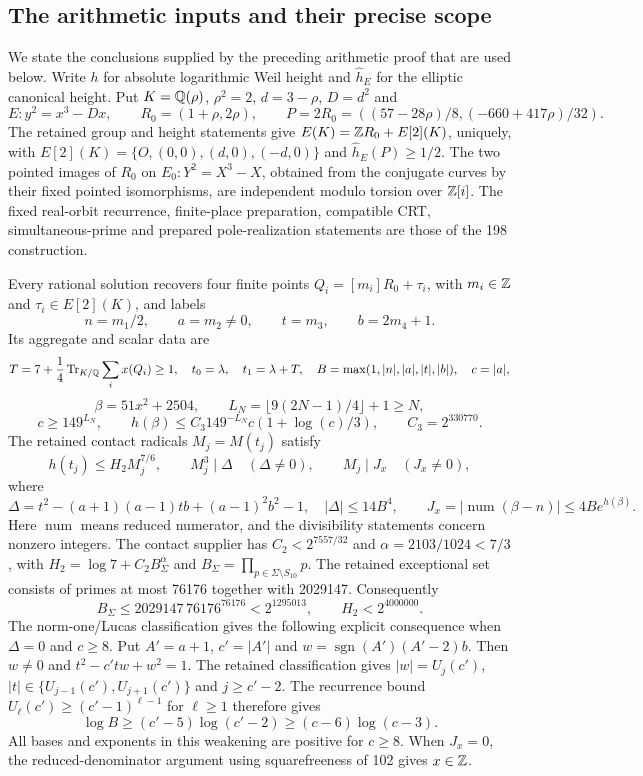 \subsection{The arithmetic inputs and their precise scope}
\label{q198bb:inputs}
We state the conclusions supplied by the preceding arithmetic proof
that are used below. Write $h$ for absolute logarithmic Weil height and
$\widehat h_E$ for the elliptic canonical height.
Put $K=\mathbb Q(\rho)$, $\rho^2=2$, $d=3-\rho$, $D=d^2$ and
\[
 E:y^2=x^3-Dx,\qquad R_0=(1+\rho,2\rho),\qquad
 P=2R_0=\left((57-28\rho)/8,(-660+417\rho)/32\right).
\]
The retained group and height statements give
$E(K)=\mathbb Z R_0+E[2](K)$, uniquely, with
$E[2](K)=\{O,(0,0),(d,0),(-d,0)\}$ and
$\widehat h_E(P)\ge1/2$. The two pointed images of $R_0$ on
$E_0:Y^2=X^3-X$, obtained from the conjugate curves by their fixed
pointed isomorphisms, are independent modulo torsion over $\mathbb Z[i]$.
The fixed real-orbit recurrence, finite-place preparation, compatible
CRT, simultaneous-prime and prepared pole-realization statements are
those of the 198 construction.

Every rational solution recovers four finite points
$Q_i=[m_i]R_0+\tau_i$, with $m_i\in\mathbb Z$ and $\tau_i\in E[2](K)$,
and labels
\[
 n=m_1/2,\qquad a=m_2\ne0,\qquad t=m_3,\qquad b=2m_4+1.
\]
Its aggregate and scalar data are
\[
 T=7+\frac14\operatorname{Tr}_{K/\mathbb Q}\sum_i x(Q_i)\ge1,
 \quad t_0=\lambda,\quad t_1=\lambda+T,
 \quad B=\max(1,|n|,|a|,|t|,|b|),\quad c=|a|,
\]
\[
 \beta=51x^2+2504,\qquad
 L_N=\lfloor9(2N-1)/4\rfloor+1\ge N,
\]
\[
 c\ge149^{L_N},\qquad
 h(\beta)\le C_3 149^{-L_N}c(1+\log(c)/3),\qquad C_3=2^{330770}.
\]
The retained contact radicals $M_j=M(t_j)$ satisfy
\[
 h(t_j)\le H_2M_j^{7/6},\qquad
 M_j^3\mid\Delta\quad(\Delta\ne0),\qquad
 M_j\mid J_x\quad(J_x\ne0),
\]
where
\[
 \Delta=t^2-(a+1)(a-1)tb+(a-1)^2b^2-1,\quad |\Delta|\le14B^4,
 \qquad J_x=|\operatorname{num}(\beta-n)|\le4B e^{h(\beta)}.
\]
Here $\operatorname{num}$ means reduced numerator, and the divisibility
statements concern nonzero integers. The contact supplier has
$C_2<2^{7557/32}$ and $\alpha=2103/1024<7/3$, with
$H_2=\log7+C_2B_\Sigma^\alpha$ and
$B_\Sigma=\prod_{p\in\Sigma\setminus S_{10}}p$. The retained exceptional
set consists of primes at most 76176 together with 2029147.
Consequently
\[
 B_\Sigma\le2029147\,76176^{76176}<2^{1295013},\qquad
 H_2<2^{4000000}.
\]
The norm-one/Lucas classification gives the following explicit
consequence when $\Delta=0$ and $c\ge8$. Put $A'=a+1$,
$c'=|A'|$ and $w=\operatorname{sgn}(A')(A'-2)b$. Then $w\ne0$ and
$t^2-c'tw+w^2=1$. The retained classification gives
$|w|=U_j(c')$, $|t|\in\{U_{j-1}(c'),U_{j+1}(c')\}$ and
$j\ge c'-2$. The recurrence bound
$U_\ell(c')\ge(c'-1)^{\ell-1}$ for $\ell\ge1$ therefore gives
\[
 \log B\ge(c'-5)\log(c'-2)\ge(c-6)\log(c-3).
\]
All bases and exponents in this weakening are positive for $c\ge8$.
When $J_x=0$, the reduced-denominator argument using squarefreeness of
102 gives $x\in\mathbb Z$.

